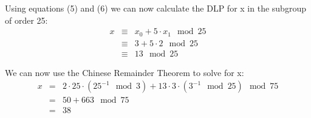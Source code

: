 Using equations (5) and (6) we can now calculate the DLP for x in the subgroup of order 25:
\begin{eqnarray*}
    x &\equiv& x_{0} + 5 \cdot x_{1} \mod 25\\
    &\equiv& 3 + 5 \cdot 2 \mod 25 \\
    &\equiv& 13 \mod 25
\end{eqnarray*}

We can now use the Chinese Remainder Theorem to solve for x:
\begin{eqnarray*}
    x &=& 2 \cdot 25 \cdot (25^{-1} \mod 3) + 13 \cdot 3 \cdot (3^{-1} \mod 25) \mod 75 \\
    &=& 50 + 663 \mod 75 \\
    &=& 38
\end{eqnarray*}